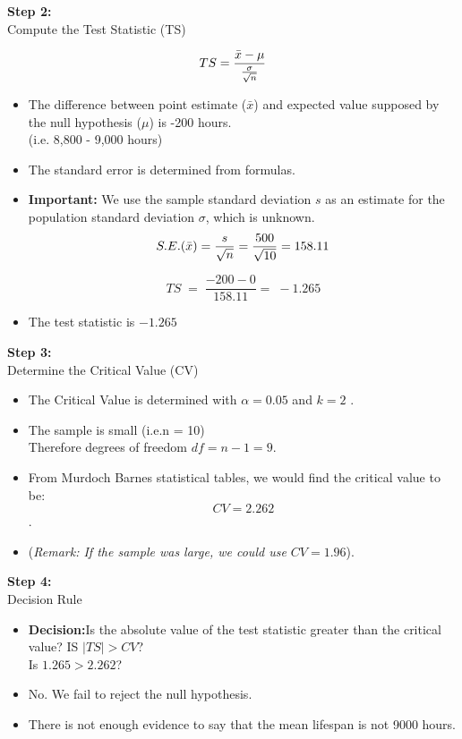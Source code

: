 \documentclass[]{report}
\begin{document}
\noindent  \textbf{Step 2:} \\ Compute the Test Statistic (TS)
{

\[TS = \frac{\bar{x} - \mu}{{\sigma \over \sqrt{n}}}\]
}
\begin{itemize}
\item The difference between point estimate ($\bar{x}$) and expected value supposed by the null hypothesis ($\mu$) is -200 hours. \\(i.e. 8,800 - 9,000 hours)
\end{itemize}


\begin{itemize}
\item The standard error is determined from formulas.
\item \textbf{Important:} We use the sample standard deviation $s$ as an estimate for the population standard deviation $\sigma$, which is unknown.
\[ S.E. (\bar{x}) = {s \over \sqrt{n}} = {500 \over \sqrt{10}}  = 158.11 \]

\[ TS\; =\; \frac{-200-0}{158.11} =\; -1.265\]
\item The test statistic is $-1.265$
\end{itemize}



\noindent \textbf{Step 3:} \\ Determine the Critical Value (CV)
\begin{itemize}

\item The Critical Value is determined with $\alpha = 0.05$ and $k = 2$ .
\item The sample is small (i.e.n = 10) \\ Therefore degrees of freedom $df = n-1 = 9$.
\item From Murdoch Barnes statistical tables, we would find the critical value to be: 
\[CV = 2.262\].

\item (\textit{Remark: If the sample was large, we could use $CV = 1.96$}).

\end{itemize}


\noindent  \textbf{Step 4:} \\ Decision Rule
\begin{itemize}

\item \textbf{Decision:}Is the absolute value of the test statistic greater than the critical value?
IS $|TS| > CV$? \\ Is $1.265 > 2.262$?
\item No. We fail to reject the null hypothesis. \item There is not enough evidence to say that the mean lifespan is not 9000 hours.
\end{itemize}
\end{document}

